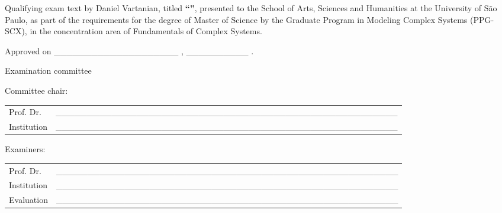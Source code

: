 \begin{folhadeaprovacao}
\noindent
Qualifying exam text by Daniel Vartanian, titled \textbf{``\imprimirtitulo''}, presented to the School of Arts, Sciences and Humanities at the University of São Paulo, as part of the requirements for the degree of Master of Science by the Graduate Program in Modeling Complex Systems (PPG-SCX), in the concentration area of Fundamentals of Complex Systems.


\vspace*{1.5cm}

\noindent
Approved on \_\_\_\_\_\_\_\_\_\_\_\_\_\_\_\_\_\_\_\_ , \_\_\_\_\_\_\_\_\_\_ .

\vspace*{1.5cm}

\begin{center}
\noindent Examination committee
\end{center}

\vspace*{0.5cm}

\noindent Committee chair:

\vspace*{0.25cm}

\renewcommand{\arraystretch}{2}
\setlength{\arrayrulewidth}{0pt}
\setlength{\tabcolsep}{0pt}
\noindent
\begin{tabular}{m{2cm} P{14cm}}
  Prof. Dr. & \_\_\_\_\_\_\_\_\_\_\_\_\_\_\_\_\_\_\_\_\_\_\_\_\_\_\_\_\_\_\_\_\_\_\_\_\_\_\_\_\_\_\_\_\_\_\_\_\_\_\_\_\_\_\_ \\
  Institution & \_\_\_\_\_\_\_\_\_\_\_\_\_\_\_\_\_\_\_\_\_\_\_\_\_\_\_\_\_\_\_\_\_\_\_\_\_\_\_\_\_\_\_\_\_\_\_\_\_\_\_\_\_\_\_ \\
\end{tabular}

\vspace*{1cm}

\noindent Examiners:

\vspace*{0.25cm}

\noindent
\begin{tabular}{m{2cm} P{14cm}}
  Prof. Dr. & \_\_\_\_\_\_\_\_\_\_\_\_\_\_\_\_\_\_\_\_\_\_\_\_\_\_\_\_\_\_\_\_\_\_\_\_\_\_\_\_\_\_\_\_\_\_\_\_\_\_\_\_\_\_\_ \\
  Institution & \_\_\_\_\_\_\_\_\_\_\_\_\_\_\_\_\_\_\_\_\_\_\_\_\_\_\_\_\_\_\_\_\_\_\_\_\_\_\_\_\_\_\_\_\_\_\_\_\_\_\_\_\_\_\_ \\
  Evaluation & \_\_\_\_\_\_\_\_\_\_\_\_\_\_\_\_\_\_\_\_\_\_\_\_\_\_\_\_\_\_\_\_\_\_\_\_\_\_\_\_\_\_\_\_\_\_\_\_\_\_\_\_\_\_\_ \\
\end{tabular}


\end{folhadeaprovacao}

